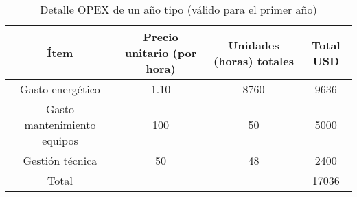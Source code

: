 \begin{table}[H]
  \centering
  \begin{tabular}{| c | c | c | c |}
    \hline{}
    Ítem & Precio unitario (por hora) & Unidades (horas) totales & Total USD \\
    \hline{}
    Gasto energético & 1.10 & 8760 & 9636 \\
    \hline{}
    Gasto mantenimiento equipos & 100 & 50 & 5000 \\
    \hline{}
    Gestión técnica & 50 & 48 & 2400 \\
    \hline{}
    Total & & & 17036 \\
    \hline
  \end{tabular}
  \caption{Detalle OPEX de un año tipo (válido para el primer año)}
  \label{tab:opex}
\end{table}
